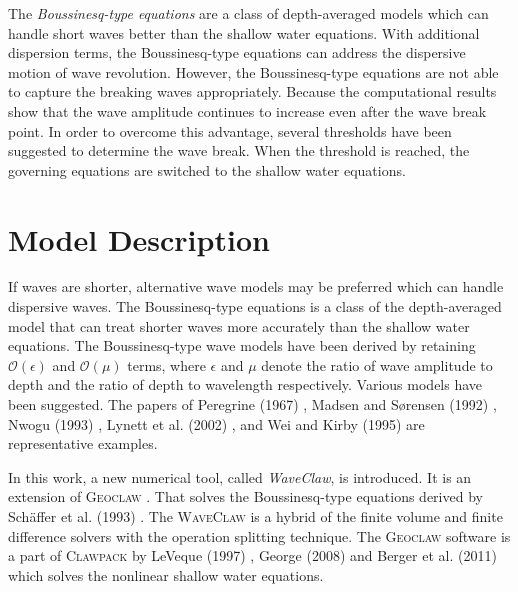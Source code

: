 \documentclass[review]{elsarticle}
\begin{document}
The {\em Boussinesq-type equations} are 
a class of depth-averaged models
which can handle short waves better than the shallow water equations.
With additional dispersion terms, 
the Boussinesq-type equations can 
address the dispersive motion of wave revolution. 
However, the Boussinesq-type equations are not able to
capture the breaking waves appropriately. 
Because the computational results show that the wave amplitude 
continues to increase even after the wave break point.
In order to overcome this advantage,
several thresholds have been 
suggested to determine the wave break. 
When the threshold is reached, the governing equations
are switched to the shallow water equations.

\section{Model Description}

If waves are shorter,
alternative wave models may be preferred 
which can handle dispersive waves. 
The Boussinesq-type equations
is a class of the depth-averaged model 
that can treat shorter waves more accurately
than the shallow water equations. 
The Boussinesq-type wave models have been derived by retaining 
$\mathcal{O}(\epsilon)$ and $\mathcal{O}(\mu)$ terms, 
where $\epsilon$ and $\mu$ 
denote the ratio of wave amplitude to depth
and the ratio of depth to wavelength respectively. 
Various models have been suggested.  
The papers of Peregrine (1967) \citep{peregrine1967long},
Madsen and S{\o}rensen (1992) \citep{madsen1992new}, Nwogu (1993) \citep{nwogu1993alternative}, Lynett et al. (2002) \cite{lynett2002modeling},
and Wei and Kirby (1995) \citep{wei1995time}
are representative examples. 

In this work, a new numerical tool, 
called {\em WaveClaw}, is introduced. 
It is an extension of \textsc{Geoclaw} \citep{clawpack}.
That solves 
the Boussinesq-type equations derived by
Sch{\"a}ffer et al. (1993) \citep{schaffer1993boussinesq}.
The \textsc{WaveClaw}
is a hybrid of the finite volume and finite difference solvers
with the operation splitting technique.
The \textsc{Geoclaw} software is 
a part of \textsc{Clawpack} \citep{clawpack}
by LeVeque (1997) \cite{leveque1997wave}, George (2008) \citep{george2008augmented} and Berger et al. (2011) \citep{BergerGeorgeLeVequeMandli11}
which solves the nonlinear shallow water equations.
\end{document}

